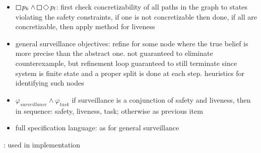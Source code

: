 \begin{itemize}
\item $\LTLglobally p_k \wedge \LTLglobally\LTLfinally p_l$: first check concretizability of all paths in the graph to states violating the safety constraints, if one is not concretizable then done, if all are concretizable, then apply method for liveness
\item general surveillance objectives: refine for some node where the true belief is more precise than the abstract one. not guaranteed to eliminate counterexample, but refinement loop guaranteed to still terminate since system is finite state and a proper split is done at each step. heuristics for identifying such nodes
\item $\varphi_{\mathit{surveillance}} \wedge \varphi_{\mathit{task}}$  if surveillance is a conjunction of safety and liveness, then in sequence: safety, liveness, task; otherwise as previous item
\item full specification language: as for general surveillance
\end{itemize}

: used in implementation